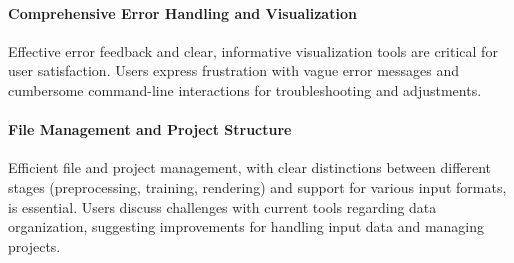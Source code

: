 


\paragraph{Comprehensive Error Handling and Visualization}
Effective error feedback and clear, informative visualization tools are critical for user satisfaction. 
Users express frustration with vague error messages and cumbersome command-line interactions for troubleshooting and adjustments. 
\cite{P2, P3}


\paragraph{File Management and Project Structure}
Efficient file and project management, with clear distinctions between different stages (preprocessing, training, rendering) and support for various input formats, is essential. 
Users discuss challenges with current tools regarding data organization, suggesting improvements for handling input data and managing projects​​.
\cite{P1, P3}



